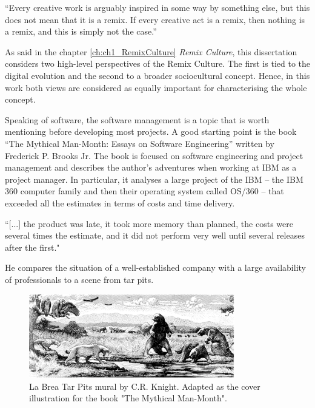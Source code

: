 \begin{displayquote}
    “Every creative work is arguably inspired in some way by something else, but this does not mean that it is a remix. If every creative act is a remix, then nothing is a remix, and this is simply not the case.”
\end{displayquote}

As said in the chapter \ref{ch:ch1_RemixCulture} \emph{Remix Culture}, this dissertation considers two high-level perspectives of the Remix Culture. The first is tied to the digital evolution and the second to a broader sociocultural concept. Hence, in this work both views are considered as equally important for characterising the whole concept.

Speaking of software, the software management is a topic that is worth mentioning before developing most projects. A good starting point is the book “The Mythical Man-Month: Essays on Software Engineering” written by Frederick P. Brooks Jr. The book is focused on software engineering and project management and describes the author’s adventures when working at IBM as a project manager. In particular, it analyses a large project of the IBM – the IBM 360 computer family and then their operating system called OS/360 – that exceeded all the estimates in terms of costs and time delivery.

\begin{displayquote}
    “[...] the product was late, it took more memory than planned, the costs were several times the estimate, and it did not perform very well until several releases after the first."
\end{displayquote}

He compares the situation of a well-established company with a large availability of professionals to a scene from tar pits.

\begin{figure}[H]
\centering
\includegraphics[width=0.8\textwidth]{images/tar_pit.png}
\caption{La Brea Tar Pits mural by C.R. Knight. Adapted as the cover illustration for the book "The Mythical Man-Month".}
\label{fig:The Mythical Man-Month}
\end{figure}

